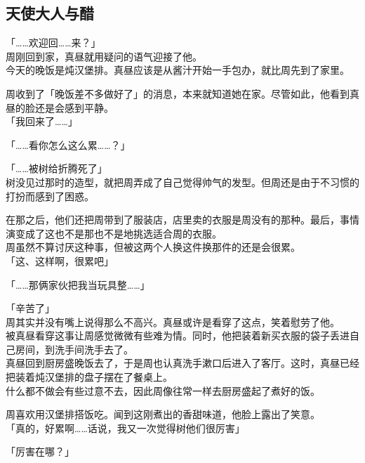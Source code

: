 \subsection{天使大人与醋}

「……欢迎回……来？」\\

周刚回到家，真昼就用疑问的语气迎接了他。\\

今天的晚饭是炖汉堡排。真昼应该是从酱汁开始一手包办，就比周先到了家里。

周收到了「晚饭差不多做好了」的消息，本来就知道她在家。尽管如此，他看到真昼的脸还是会感到平静。\\

「我回来了……」

「……看你怎么这么累……？」

「……被树给折腾死了」\\

树没见过那时的造型，就把周弄成了自己觉得帅气的发型。但周还是由于不习惯的打扮而感到了困惑。

在那之后，他们还把周带到了服装店，店里卖的衣服是周没有的那种。最后，事情演变成了这也不是那也不是地挑选适合周的衣服。\\

周虽然不算讨厌这种事，但被这两个人换这件换那件的还是会很累。\\

「这、这样啊，很累吧」

「……那俩家伙把我当玩具整……」

「辛苦了」\\

周其实并没有嘴上说得那么不高兴。真昼或许是看穿了这点，笑着慰劳了他。\\

被真昼看穿这事让周感觉微微有些难为情。同时，他把装着新买衣服的袋子丢进自己房间，到洗手间洗手去了。\\

真昼回到厨房盛晚饭去了，于是周也认真洗手漱口后进入了客厅。这时，真昼已经把装着炖汉堡排的盘子摆在了餐桌上。\\

什么都不做会有些过意不去，因此周像往常一样去厨房盛起了煮好的饭。

周喜欢用汉堡排搭饭吃。闻到这刚煮出的香甜味道，他脸上露出了笑意。\\

「真的，好累啊……话说，我又一次觉得树他们很厉害」

「厉害在哪？」\\

